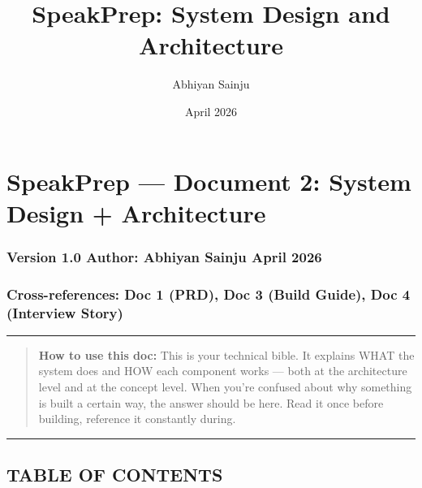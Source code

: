 \documentclass[
  11pt,
]{article}
\title{SpeakPrep: System Design and Architecture}
\author{Abhiyan Sainju}
\date{April 2026}
\begin{document}
\maketitle

\hypertarget{speakprep-document-2-system-design-architecture}{%
\section{SpeakPrep --- Document 2: System Design +
Architecture}\label{speakprep-document-2-system-design-architecture}}

\hypertarget{version-1.0-author-abhiyan-sainju-april-2026}{%
\subsubsection{Version 1.0 \textbar{} Author: Abhiyan Sainju \textbar{}
April 2026}\label{version-1.0-author-abhiyan-sainju-april-2026}}

\hypertarget{cross-references-doc-1-prd-doc-3-build-guide-doc-4-interview-story}{%
\subsubsection{Cross-references: Doc 1 (PRD), Doc 3 (Build Guide), Doc 4
(Interview
Story)}\label{cross-references-doc-1-prd-doc-3-build-guide-doc-4-interview-story}}

\begin{center}\rule{0.5\linewidth}{0.5pt}\end{center}

\begin{quote}
\textbf{How to use this doc:} This is your technical bible. It explains
WHAT the system does and HOW each component works --- both at the
architecture level and at the concept level. When you're confused about
why something is built a certain way, the answer should be here. Read it
once before building, reference it constantly during.
\end{quote}

\begin{center}\rule{0.5\linewidth}{0.5pt}\end{center}

\hypertarget{table-of-contents}{%
\subsection{TABLE OF CONTENTS}\label{table-of-contents}}
\end{document}
